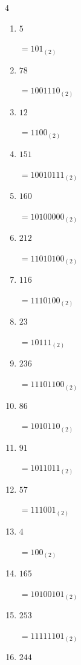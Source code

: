 \begin{multicols}{4}
\begin{enumerate}
        $=10101011_{(2)}$

  \item $5$

        $=101_{(2)}$

  \item $78$

        $=1001110_{(2)}$

  \item $12$

        $=1100_{(2)}$

  \item $151$

        $=10010111_{(2)}$

  \item $160$

        $=10100000_{(2)}$

  \item $212$

        $=11010100_{(2)}$

  \item $116$

        $=1110100_{(2)}$

  \item $23$

        $=10111_{(2)}$

\columnbreak %

  \item $236$

        $=11101100_{(2)}$

  \item $86$

        $=1010110_{(2)}$

  \item $91$

        $=1011011_{(2)}$

  \item $57$

        $=111001_{(2)}$

  \item $4$

        $=100_{(2)}$

  \item $165$

        $=10100101_{(2)}$

  \item $253$

        $=11111101_{(2)}$

  \item $244$


\end{enumerate}
\end{multicols}
